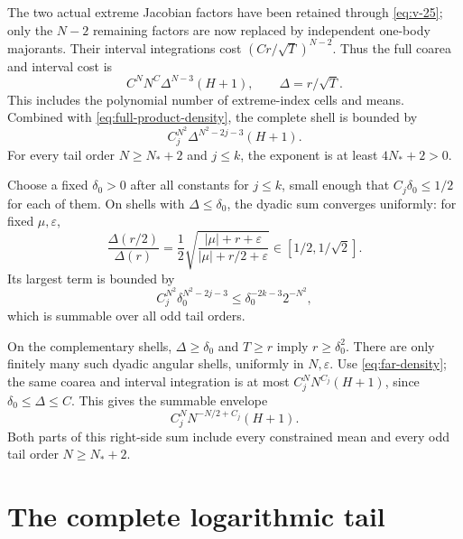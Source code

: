 \documentclass[11pt]{article}
\numberwithin{equation}{section}
\theoremstyle{remark}\newtheorem{remark}[theorem]{Remark}
\begin{document}
The two actual extreme Jacobian factors have been retained through
\eqref{eq:v-25}; only the $N-2$ remaining factors are now replaced by
independent one-body majorants. Their interval integrations cost
$(Cr/\sqrt T)^{N-2}$. Thus the full coarea and interval cost is
\[
 C^NN^{C}\Delta^{N-3}(H+1),\qquad \Delta=r/\sqrt T.
\]
This includes the polynomial number of extreme-index cells and means.
Combined with \eqref{eq:full-product-density}, the complete shell is
bounded by
\begin{equation}\label{eq:v-28}
 C_j^{N^2}\Delta^{N^2-2j-3}(H+1).
\end{equation}
For every tail order $N\ge N_*+2$ and $j\le k$, the exponent
is at least $4N_*+2>0$.

Choose a fixed $\delta_0>0$ after all constants for $j\le k$,
small enough that $C_j\delta_0\le1/2$ for each of them.
On shells with $\Delta\le\delta_0$, the dyadic sum converges
uniformly: for fixed $\mu,\varepsilon$,
\[
 \frac{\Delta(r/2)}{\Delta(r)}
 =\frac12\sqrt{\frac{|\mu|+r+\varepsilon}
 {|\mu|+r/2+\varepsilon}}\in[1/2,1/\sqrt2].
\]
Its largest term is bounded by
\[
 C_j^{N^2}\delta_0^{N^2-2j-3}
 \le \delta_0^{-2k-3}2^{-N^2},
\]
which is summable over all odd tail orders.

On the complementary shells, $\Delta\ge\delta_0$ and
$T\ge r$ imply $r\ge\delta_0^2$. There are only finitely many
such dyadic angular shells, uniformly in $N,\varepsilon$.
Use \eqref{eq:far-density}; the same coarea and interval
integration is at most $C_j^NN^{C_j}(H+1)$, since
$\delta_0\le\Delta\le C$.
This gives the summable envelope
\[
 C_j^NN^{-N/2+C_j}(H+1).
\]
Both parts of this right-side sum include every constrained mean and
every odd tail order $N\ge N_*+2$.

\section{The complete logarithmic tail}
\label{sec:constrained-tail-sum}
\end{document}
